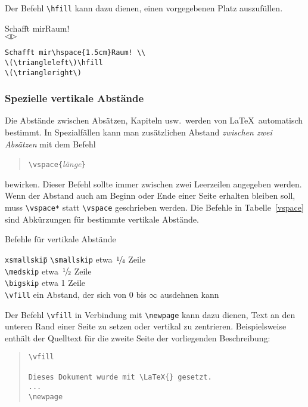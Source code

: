 Der Befehl \verb|\hfill| kann dazu dienen, einen vorgegebenen
Platz auszufüllen.
\exa
\raggedright
Schafft mir\hspace{1.5cm}Raum! \\
\(\triangleleft\)\hfill \(\triangleright\)\\
\exb
\begin{verbatim}
Schafft mir\hspace{1.5cm}Raum! \\
\(\triangleleft\)\hfill 
\(\triangleright\)
\end{verbatim}
\exc


\subsubsection{Spezielle vertikale Abstände} \label{vabstaende}
 
Die Abstände zwischen Absätzen, Kapiteln usw.\ werden von
\LaTeX\ automatisch bestimmt.
In Spezialfällen kann man zusätzlichen Abstand
\emph{zwischen zwei Absätzen} mit dem Befehl
\begin{verse}
\verb|\vspace{|\textit{länge}\verb|}|
\end{verse}
bewirken.
Dieser Befehl sollte immer zwischen zwei Leerzeilen angegeben
werden.
Wenn der Abstand auch am Beginn oder Ende einer Seite erhalten
bleiben soll, muss \verb|\vspace*| statt \verb|\vspace|
geschrieben werden.
Die Befehle in Tabelle~\ref{vspace} sind Abkürzungen für
bestimmte vertikale Abstände.
\begin{table}[t]
\caption{Befehle für vertikale Abstände} \label{vspace}
\begin{lminipage}{13cm}
\begin{tabbing}
\texttt{xsmallskip}\qquad \= \kill
\verb|\smallskip| \> etwa \(\nfrac{1}{4}\) Zeile \\
\verb|\medskip|   \> etwa \(\nfrac{1}{2}\) Zeile \\
\verb|\bigskip|   \> etwa 1 Zeile \\
\verb|\vfill|     \> ein Abstand, der sich von 0 bis \(\infty\)
                     ausdehnen kann
\end{tabbing}
\end{lminipage}
\end{table}
Der Befehl \verb|\vfill| in Verbindung mit \verb|\newpage|
kann dazu dienen, Text an den unteren Rand einer Seite zu setzen
oder vertikal zu zentrieren.  Beispielsweise enthält der Quelltext
für die zweite Seite der vorliegenden Beschreibung:
\begin{quote}
\begin{verbatim}
\vfill

Dieses Dokument wurde mit \LaTeX{} gesetzt.
...
\newpage
\end{verbatim}
\end{quote}
 
